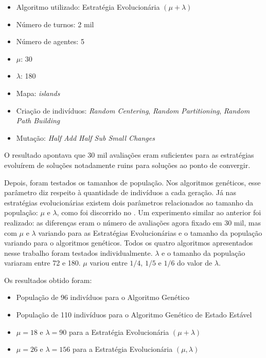 \begin{itemize}
	\item Algoritmo utilizado: Estratégia Evolucionária $(\mu + \lambda)$
	\item Número de turnos: 2 mil
	\item Número de agentes: 5
	\item $\mu$: 30
	\item $\lambda$: 180
	\item Mapa: \textit{islands}
	\item Criação de indivíduos: \textit{Random Centering}, 
	\textit{Random Partitioning}, \textit{Random Path Building}
	\item Mutação: \textit{Half Add Half Sub Small Changes}
\end{itemize}

O resultado apontava que 30 mil avaliações eram suficientes para as 
estratégias evoluírem de soluções notadamente ruins para soluções ao ponto 
de convergir.

Depois, foram testados os tamanhos de população. Nos algoritmos genéticos, 
esse parâmetro diz respeito à quantidade de indivíduos a cada geração. 
Já nas estratégias evolucionárias existem dois parâmetros relacionados ao tamanho 
da população: $\mu$ e $\lambda$, como foi discorrido no . Um 
experimento similar ao anterior foi realizado: as diferenças eram o número de 
avaliações agora fixado em 30 mil, mas com $\mu$ e $\lambda$ variando para as 
Estratégias Evolucionárias e o tamanho da população variando para o algoritmos 
genéticos. Todos os quatro algoritmos apresentados nesse trabalho foram testados 
individualmente. $\lambda$ e o tamanho da população variaram entre 72 e 180. 
$\mu$ variou entre $1/4$, $1/5$ e $1/6$ do valor de $\lambda$.

Os resultados obtido foram:
\begin{itemize}
	\item População de 96 indivíduos para o Algoritmo Genético
	\item População de 110 indivíduos para o Algoritmo Genético de Estado Estável
	\item $\mu = 18$ e $\lambda = 90$ para a Estratégia Evolucionária 
	$(\mu + \lambda)$
	\item $\mu = 26$ e $\lambda = 156$ para a Estratégia Evolucionária 
	$(\mu, \lambda)$
\end{itemize}

